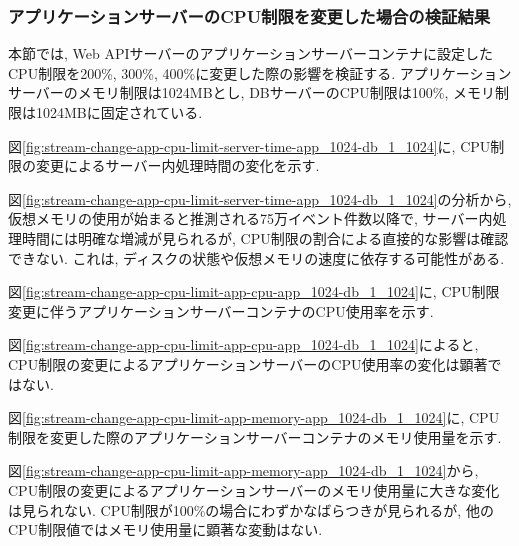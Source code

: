 \documentclass[../../../../main]{subfiles}
\begin{document}
    \subsubsection{アプリケーションサーバーのCPU制限を変更した場合の検証結果}\label{subsubsec:result-streaming-change-app-cpu}

    本節では, Web APIサーバーのアプリケーションサーバーコンテナに設定したCPU制限を200\%, 300\%, 400\%に変更した際の影響を検証する. アプリケーションサーバーのメモリ制限は1024MBとし, DBサーバーのCPU制限は100\%, メモリ制限は1024MBに固定されている.


    図\ref{fig:stream-change-app-cpu-limit-server-time-app_1024-db_1_1024}に, CPU制限の変更によるサーバー内処理時間の変化を示す.

    

    図\ref{fig:stream-change-app-cpu-limit-server-time-app_1024-db_1_1024}の分析から, 仮想メモリの使用が始まると推測される75万イベント件数以降で, サーバー内処理時間には明確な増減が見られるが, CPU制限の割合による直接的な影響は確認できない. これは, ディスクの状態や仮想メモリの速度に依存する可能性がある.


    図\ref{fig:stream-change-app-cpu-limit-app-cpu-app_1024-db_1_1024}に, CPU制限変更に伴うアプリケーションサーバーコンテナのCPU使用率を示す.

    

    図\ref{fig:stream-change-app-cpu-limit-app-cpu-app_1024-db_1_1024}によると, CPU制限の変更によるアプリケーションサーバーのCPU使用率の変化は顕著ではない.


    図\ref{fig:stream-change-app-cpu-limit-app-memory-app_1024-db_1_1024}に, CPU制限を変更した際のアプリケーションサーバーコンテナのメモリ使用量を示す.

    

    図\ref{fig:stream-change-app-cpu-limit-app-memory-app_1024-db_1_1024}から, CPU制限の変更によるアプリケーションサーバーのメモリ使用量に大きな変化は見られない. CPU制限が100\%の場合にわずかなばらつきが見られるが, 他のCPU制限値ではメモリ使用量に顕著な変動はない.

\end{document}

